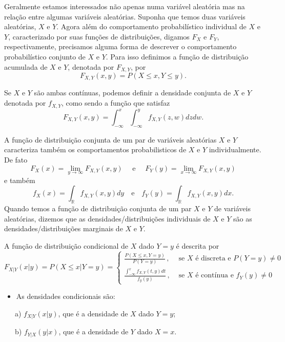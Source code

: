 \documentclass[
]{book}
\providecommand{\tightlist}{%
  \setlength{\itemsep}{0pt}\setlength{\parskip}{0pt}}
\theoremstyle{definition}
\theoremstyle{definition}
\theoremstyle{definition}
\theoremstyle{remark}
\begin{document}
Geralmente estamos interessados não apenas numa variável aleatória mas na relação entre algumas variáveis aleatórias. Suponha que temos duas variáveis aleatórias, \(X\) e \(Y\). Agora além do comportamento probabilístico individual de \(X\) e \(Y\), caracterizado por suas funções de distribuições, digamos \(F_X\) e \(F_Y\), respectivamente, precisamos alguma forma de descrever o comportamento probabilístico conjunto de \(X\) e \(Y\). Para isso definimos a função de distribuição acumulada de \(X\) e \(Y\), denotada por \(F_{X,Y}\), por \[F_{X,Y}(x,y)=P(X\leq x, Y\leq y).\]

Se \(X\) e \(Y\) são ambas contínuas, podemos definir a densidade conjunta de \(X\) e \(Y\) denotada por \(f_{X,Y}\), como sendo a função que satisfaz
\[F_{X,Y}(x,y)=\int_{-\infty}^x \int_{-\infty}^y f_{X,Y}(z,w)dzdw.\]

A função de distribuição conjunta de um par de variáveis aleatórias \(X\) e \(Y\) caracteriza também os comportamentos probabilisticos de \(X\) e \(Y\) individualmente. De fato
\[F_X(x)=\lim_{y\rightarrow\infty}F_{X,Y}(x,y) \quad \mbox{ e }\quad F_Y(y)=\lim_{x\rightarrow\infty}F_{X,Y}(x,y)\]
e também
\begin{equation*}
f_X(x)=\int_{\mathbb{R}}f_{X,Y}(x,y)dy\quad\mbox{e}\quad f_Y(y)=\int_{\mathbb{R}}f_{X,Y}(x,y)dx.
\end{equation*}
Quando temos a função de distribuição conjunta de um par \(X\) e \(Y\) de variáveis aleatórias, dizemos que as densidades/distribuições individuais de \(X\) e \(Y\) são as densidades/distribuições marginais de \(X\) e \(Y\).

A função de distribuição condicional de \(X\) dado \(Y=y\) é descrita por
\[F_{X|Y}(x|y)=P(X\leq x|Y=y)
=\left\{\begin{array}{cc} \frac{P(X\leq x,Y=y)}{P(Y=y)}\,, & \mbox{ se $X$ é discreta e }P(Y=y)\neq 0 \,\,\, \\
\frac{\int_{-\infty}^x f_{X,Y}(t,y)dt}{f_y(y)}\,, & \mbox{ se $X$ é contínua e } f_Y(y)\neq 0\end{array}\right.
\]

\begin{itemize}
\tightlist
\item
  As densidades condicionais são:
\end{itemize}

~~~a) \(f_{X|Y}(x|y)\), que é a densidade de \(X\) dado \(Y=y\);

~~~b) \(f_{Y|X}(y|x)\), que é a densidade de \(Y\) dado \(X=x\).
\end{document}
